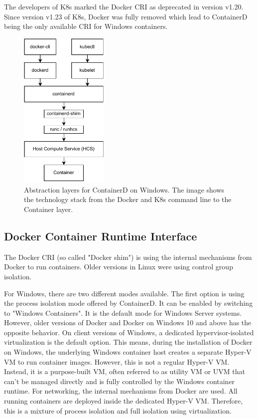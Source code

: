 The developers of \ac{K8s} marked the Docker \ac{CRI} as deprecated in version v1.20\cite{Kubernetes.2020}. Since version v1.23 of \ac{K8s}, Docker was fully removed which lead to ContainerD being the only available \ac{CRI} for \ac{Windows} containers.

\begin{figure}[h]
	\centering
	\includegraphics[width=0.38\textwidth]{Figures/containerd-architecture.pdf}
	\caption{Abstraction layers for ContainerD on Windows. The image shows the technology stack from the Docker and \ac{K8s} command line to the Container layer.\cite{Scooley.2022}}
	\label{fig.containerd-architecture}
\end{figure}


\subsection{Docker Container Runtime Interface}
The Docker \ac{CRI} (so called "Docker shim") is using the internal mechanisms from Docker to run containers. Older versions in Linux were using control group isolation.

For \ac{Windows}, there are two different modes available. The first option is using the process isolation mode offered by ContainerD. It can be enabled by switching to "\ac{Windows} Containers". It is the default mode for Windows Server systems. However, older versions of Docker and Docker on Windows 10 and above has the opposite behavior\cite{RamosApolinario.2021}. On client versions of Windows, a dedicated hypervisor-isolated virtualization is the default option\cite{RamosApolinario.2021}. This means, during the installation of Docker on \ac{Windows}, the underlying Windows container host creates a separate Hyper-V \ac{VM} to run container images. However, this is not a regular Hyper-V \ac{VM}. Instead, it is a purpose-built \ac{VM}, often referred to as utility \ac{VM} or UVM that can't be managed directly and is fully controlled by the \ac{Windows} container runtime\cite{RamosApolinario.2021}. For networking, the internal mechanisms from Docker are used. All running containers are deployed inside the dedicated Hyper-V \ac{VM}. Therefore, this is a mixture of process isolation and full isolation using virtualization.

